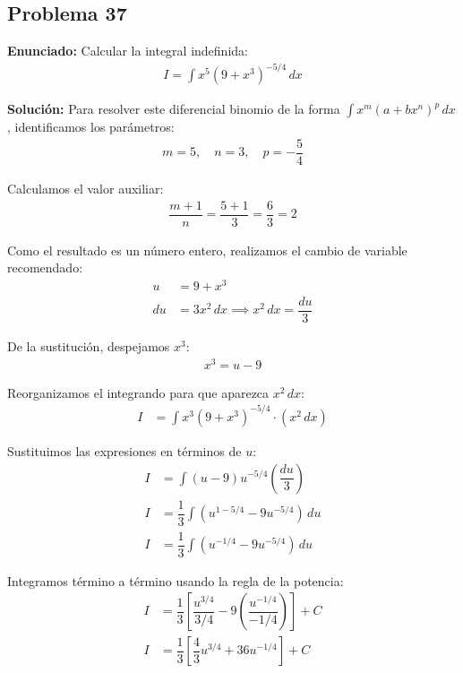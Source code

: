 \subsection*{Problema 37}

\textbf{Enunciado:}
Calcular la integral indefinida:
\begin{align*}
    I = \int x^5 (9 + x^3)^{-5/4} \, dx
\end{align*}

\textbf{Solución:}
Para resolver este diferencial binomio de la forma $\int x^m (a + bx^n)^p \, dx$, identificamos los parámetros:
\begin{align*}
    m = 5, \quad n = 3, \quad p = -\dfrac{5}{4}
\end{align*}

Calculamos el valor auxiliar:
\begin{align*}
    \dfrac{m + 1}{n} = \dfrac{5 + 1}{3} = \dfrac{6}{3} = 2
\end{align*}

Como el resultado es un número entero, realizamos el cambio de variable recomendado:
\begin{align*}
    u &= 9 + x^3 \\
    du &= 3x^2 \, dx \implies x^2 \, dx = \dfrac{du}{3}
\end{align*}

De la sustitución, despejamos $x^3$:
\begin{align*}
    x^3 = u - 9
\end{align*}

Reorganizamos el integrando para que aparezca $x^2 \, dx$:
\begin{align*}
    I &= \int x^3 (9 + x^3)^{-5/4} \cdot (x^2 \, dx)
\end{align*}

Sustituimos las expresiones en términos de $u$:
\begin{align*}
    I &= \int (u - 9) u^{-5/4} \left(\dfrac{du}{3}\right) \\
    I &= \dfrac{1}{3} \int (u^{1 - 5/4} - 9u^{-5/4}) \, du \\
    I &= \dfrac{1}{3} \int (u^{-1/4} - 9u^{-5/4}) \, du
\end{align*}

Integramos término a término usando la regla de la potencia:
\begin{align*}
    I &= \dfrac{1}{3} \left[ \dfrac{u^{3/4}}{3/4} - 9 \left( \dfrac{u^{-1/4}}{-1/4} \right) \right] + C \\
    I &= \dfrac{1}{3} \left[ \dfrac{4}{3}u^{3/4} + 36u^{-1/4} \right] + C
\end{align*}

